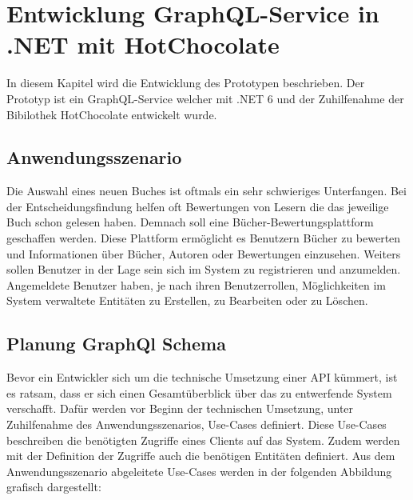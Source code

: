 \chapter{Entwicklung GraphQL-Service in .NET mit HotChocolate}
In diesem Kapitel wird die Entwicklung des Prototypen beschrieben.
Der Prototyp ist ein GraphQL-Service welcher mit .NET 6 und der Zuhilfenahme der Bibilothek HotChocolate entwickelt wurde.

\section{Anwendungsszenario}
Die Auswahl eines neuen Buches ist oftmals ein sehr schwieriges Unterfangen.
Bei der Entscheidungsfindung helfen oft Bewertungen von Lesern die das jeweilige Buch schon gelesen haben.
Demnach soll eine Bücher-Bewertungsplattform geschaffen werden.
Diese Plattform ermöglicht es Benutzern Bücher zu bewerten und Informationen über Bücher, Autoren oder Bewertungen einzusehen.
Weiters sollen Benutzer in der Lage sein sich im System zu registrieren und anzumelden.
Angemeldete Benutzer haben, je nach ihren Benutzerrollen, Möglichkeiten im System verwaltete Entitäten zu Erstellen, zu Bearbeiten oder zu Löschen.

\section{Planung GraphQl Schema}
Bevor ein Entwickler sich um die technische Umsetzung einer API kümmert, ist es ratsam, dass er sich einen Gesamtüberblick über das zu entwerfende System verschafft.
Dafür werden vor Beginn der technischen Umsetzung, unter Zuhilfenahme des Anwendungsszenarios, Use-Cases definiert.
Diese Use-Cases beschreiben die benötigten Zugriffe eines Clients auf das System.
Zudem werden mit der Definition der Zugriffe auch die benötigen Entitäten definiert.
Aus dem Anwendungsszenario abgeleitete Use-Cases werden in der folgenden Abbildung grafisch dargestellt:


